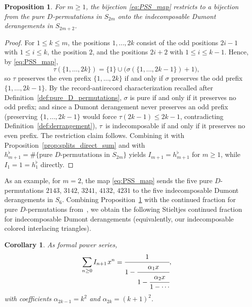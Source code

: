 \documentclass[pdftex]{sigma}
\numberwithin{equation}{section}
\newcommand{\ssp}{\hspace{1pt}}
\newtheorem{Corollary}[Theorem]{Corollary}
\newtheorem{Proposition}[Theorem]{Proposition}
\theoremstyle{definition}
\begin{document}
\begin{Proposition}\label{prop:pure_indecomposable_bijection}
	For $m\ge1$, the bijection \eqref{eq:PSS_map} restricts to a bijection
	from the pure $D$\nobreakdash-per\-mutations in $S_{2m}$ onto the indecomposable
	Dumont derangements in $S_{2m+2}$.
\end{Proposition}
\begin{proof}
	For $1\le k\le m$, the positions $1,\dots,2k$ consist of the odd
	positions $2i-1$ with $1\le i\le k$, the position $2$, and the
	positions $2i+2$ with $1\le i\le k-1$.
	Hence, by \eqref{eq:PSS_map},
	\begin{equation*}
		\tau(\{1,\dots,2k\})=\{1\}\cup
		\bigl(\sigma(\{1,\dots,2k-1\})+1\bigr),
	\end{equation*}
	so $\tau$ preserves the even prefix $\{1,\dots,2k\}$ if and only if
	$\sigma$ preserves the odd prefix $\{1,\dots,{2k-1}\}$.
	By the record-antirecord characterization recalled after
	Definition~\ref{def:pure_D_permutations}, $\sigma$ is pure if and only if it
	preserves no odd prefix; and since a Dumont derangement never preserves
	an odd prefix (preserving $\{1,\dots,2k-1\}$ would force
	$\tau(2k-1)\le 2k-1$, contradicting Definition~\ref{def:derrangement}), $\tau$~is indecomposable if and only if it preserves no even prefix.
	The restriction claim follows.
	Combining it with Proposition~\ref{prop:splits_direct_sum} and with
	$h^\flat_{m+1}=\#\{\text{pure $D$-permutations in }S_{2m}\}$
	\cite{DebSokal2024} yields $I_{m+1}=h^\flat_{m+1}$ for $m\ge1$, while
	$I_1=1=h^\flat_1$ directly.
\end{proof}

As an example, for $m=2$, the map \eqref{eq:PSS_map} sends the five pure
$D$-permutations $2143$, $3142$, $3241$, $4132$, $4231$ to the five
indecomposable Dumont derangements in $S_6$.
Combining Proposition~\ref{prop:pure_indecomposable_bijection} with the continued fraction for pure $D$-permutations from~\cite{DebSokal2024}, we obtain the following Stieltjes continued fraction for indecomposable Dumont derangements (equivalently, our indecomposable colored interlacing triangles).

\begin{Corollary}\label{cor:indecomposable_Sfrac} As formal power series,
\begin{equation*} \sum_{n\ge0}I_{n+1}\ssp x^n=\cfrac{1}{1-\cfrac{\alpha_1 x}{1-\cfrac{\alpha_2 x}{1-\cdots}}},
\end{equation*}
 with coefficients $\alpha_{2k-1}=k^2$
and $\alpha_{2k}=(k+1)^2$.
\end{Corollary}
\end{document}
